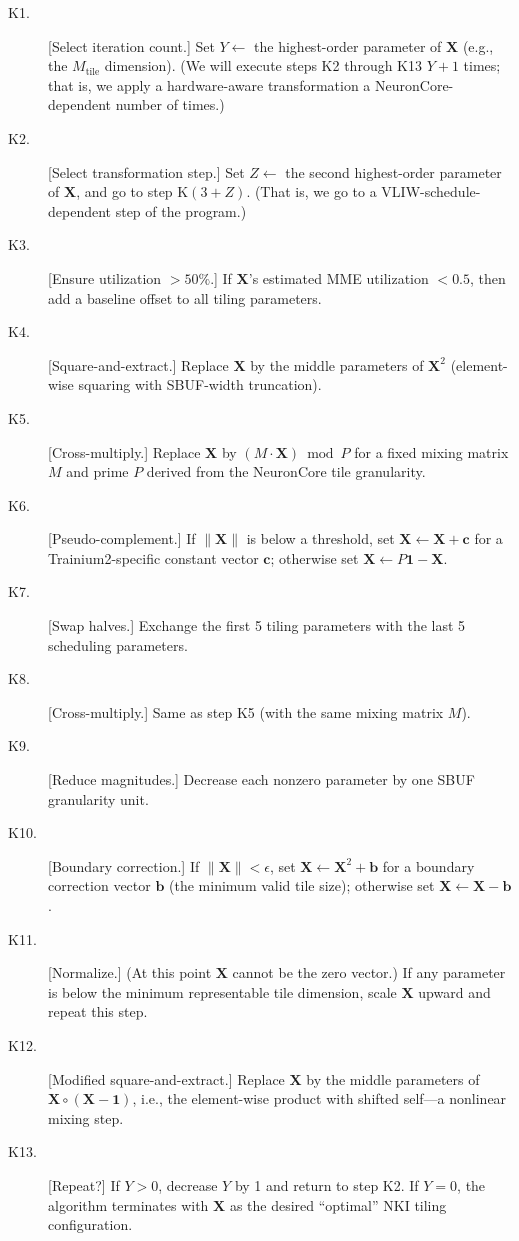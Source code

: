 \documentclass[12pt]{article}
\newcommand{\SBUF}{\textsc{SBUF}}                 %
\newcommand{\MME}{\textsc{MME}}                   %
\begin{document}
\begin{description}
\item[K1.] [Select iteration count.] Set $Y \leftarrow$ the highest-order parameter of $\mathbf{X}$ (e.g., the $M_{\mathrm{tile}}$ dimension). (We will execute steps K2 through K13 $Y+1$ times; that is, we apply a hardware-aware transformation a NeuronCore-dependent number of times.)
\item[K2.] [Select transformation step.] Set $Z \leftarrow$ the second highest-order parameter of $\mathbf{X}$, and go to step $\mathrm{K}(3+Z)$. (That is, we go to a VLIW-schedule-dependent step of the program.)
\item[K3.] [Ensure utilization $> 50\%$.] If $\mathbf{X}$'s estimated \MME{} utilization $< 0.5$, then add a baseline offset to all tiling parameters.
\item[K4.] [Square-and-extract.] Replace $\mathbf{X}$ by the middle parameters of $\mathbf{X}^2$ (element-wise squaring with \SBUF{}-width truncation).
\item[K5.] [Cross-multiply.] Replace $\mathbf{X}$ by $(M \cdot \mathbf{X}) \bmod P$ for a fixed mixing matrix $M$ and prime $P$ derived from the NeuronCore tile granularity.
\item[K6.] [Pseudo-complement.] If $\|\mathbf{X}\|$ is below a threshold, set $\mathbf{X} \leftarrow \mathbf{X} + \mathbf{c}$ for a Trainium2-specific constant vector $\mathbf{c}$; otherwise set $\mathbf{X} \leftarrow P\mathbf{1} - \mathbf{X}$.
\item[K7.] [Swap halves.] Exchange the first 5 tiling parameters with the last 5 scheduling parameters.
\item[K8.] [Cross-multiply.] Same as step K5 (with the same mixing matrix $M$).
\item[K9.] [Reduce magnitudes.] Decrease each nonzero parameter by one \SBUF{} granularity unit.
\item[K10.] [Boundary correction.] If $\|\mathbf{X}\| < \epsilon$, set $\mathbf{X} \leftarrow \mathbf{X}^2 + \mathbf{b}$ for a boundary correction vector $\mathbf{b}$ (the minimum valid tile size); otherwise set $\mathbf{X} \leftarrow \mathbf{X} - \mathbf{b}$.
\item[K11.] [Normalize.] (At this point $\mathbf{X}$ cannot be the zero vector.) If any parameter is below the minimum representable tile dimension, scale $\mathbf{X}$ upward and repeat this step.
\item[K12.] [Modified square-and-extract.] Replace $\mathbf{X}$ by the middle parameters of $\mathbf{X} \circ (\mathbf{X} - \mathbf{1})$, i.e., the element-wise product with shifted self---a nonlinear mixing step.
\item[K13.] [Repeat?] If $Y > 0$, decrease $Y$ by 1 and return to step K2. If $Y = 0$, the algorithm terminates with $\mathbf{X}$ as the desired ``optimal'' NKI tiling configuration.
\end{description}
\end{document}
